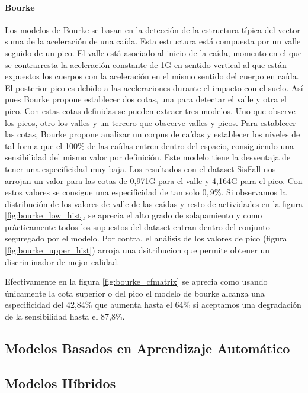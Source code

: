 \documentclass[../tfm.tex]{subfiles}
\begin{document}
\paragraph{Bourke}

Los modelos de Bourke \cite{Bourke2006} se basan en la detección de la estructura típica del vector suma de la aceleración de una caída. Esta estructura está compuesta por un valle seguido de un pico. El valle está asociado al inicio de la caída, momento en el que se contrarresta la aceleración constante de 1G en sentido vertical al que están expuestos los cuerpos con la aceleración en el mismo sentido del cuerpo en caída. El posterior pico es debido a las aceleraciones durante el impacto con el suelo. Así pues Bourke propone establecer dos cotas, una para detectar el valle y otra el pico. Con estas cotas definidas se pueden extraer tres modelos. Uno que observe los picos, otro los valles y un tercero que obseerve valles y picos.
Para establecer las cotas, Bourke propone analizar un corpus de caídas y establecer los niveles de tal forma que el 100\% de las caídas entren dentro del espacio, consiguiendo una sensibilidad del mismo valor por definición. Este modelo tiene la desventaja de tener una especificidad muy baja. Los resultados con el dataset SisFall nos arrojan un valor para las cotas de 0,971G para el valle y 4,164G para el pico. Con estos valores se consigue una especificidad de tan solo $0,9\%$. Si observamos la distribución de los valores de valle de las caídas y resto de actividades en la figura \ref{fig:bourke_low_hist}, se aprecia el alto grado de solapamiento y como pràcticamente todos los supuestos del dataset entran dentro del conjunto seguregado por el modelo. Por contra, el análisis de los valores de pico (figura \ref{fig:bourke_upper_hist}) arroja una dsitribucion que permite obtener un discriminador de mejor calidad.

Efectivamente en la figura \ref{fig:bourke_cfmatrix} se aprecia como usando únicamente la cota superior o del pico el modelo de bourke alcanza una especificidad del 42,84\% que aumenta hasta el 64\% si aceptamos una degradación de la sensibilidad hasta el 87,8\%.

\subsection{Modelos Basados en Aprendizaje Automático}

\subsection{Modelos Híbridos}
\end{document}
